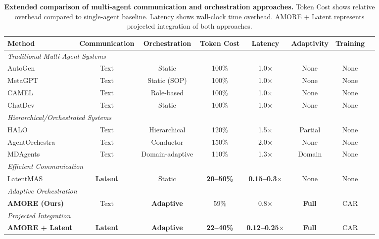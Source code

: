 
\begin{table}[htb!]
	\caption{\textbf{Extended comparison of multi-agent communication and orchestration approaches.}
		Token Cost shows relative overhead compared to single-agent baseline.
		Latency shows wall-clock time overhead.
		AMORE + Latent represents projected integration of both approaches.}
	\label{tab:extended_comparison}
	\centering
	\small
		\setlength{\tabcolsep}{1.4pt}
	\begin{tabular}{lccccccc}
		\toprule
		\textbf{Method} & \textbf{Communication} & \textbf{Orchestration} & \textbf{Token Cost} & \textbf{Latency} & \textbf{Adaptivity} & \textbf{Training} \\
		\midrule
		\multicolumn{7}{l}{\textit{Traditional Multi-Agent Systems}} \\
		AutoGen & Text & Static & 100\% & 1.0$\times$ & None & None \\
		MetaGPT & Text & Static (SOP) & 100\% & 1.0$\times$ & None & None \\
		CAMEL & Text & Role-based & 100\% & 1.0$\times$ & None & None \\
		ChatDev & Text & Static & 100\% & 1.0$\times$ & None & None \\
		\midrule
		\multicolumn{7}{l}{\textit{Hierarchical/Orchestrated Systems}} \\
		HALO & Text & Hierarchical & 120\% & 1.5$\times$ & Partial & None \\
		AgentOrchestra & Text & Conductor & 150\% & 2.0$\times$ & None & None \\
		MDAgents & Text & Domain-adaptive & 110\% & 1.3$\times$ & Domain & None \\
		\midrule
		\multicolumn{7}{l}{\textit{Efficient Communication}} \\
		LatentMAS & \textbf{Latent} & Static & \textbf{20--50\%} & \textbf{0.15--0.3$\times$} & None & None \\
		\midrule
		\multicolumn{7}{l}{\textit{Adaptive Orchestration}} \\
		\textbf{AMORE (Ours)} & Text & \textbf{Adaptive} & 59\% & 0.8$\times$ & \textbf{Full} & CAR \\
		\midrule
		\multicolumn{7}{l}{\textit{Projected Integration}} \\
		\textbf{AMORE + Latent} & \textbf{Latent} & \textbf{Adaptive} & \textbf{22--40\%} & \textbf{0.12--0.25$\times$} & \textbf{Full} & CAR \\
		\bottomrule
	\end{tabular}
	\vspace{-0.2cm}
\end{table}


